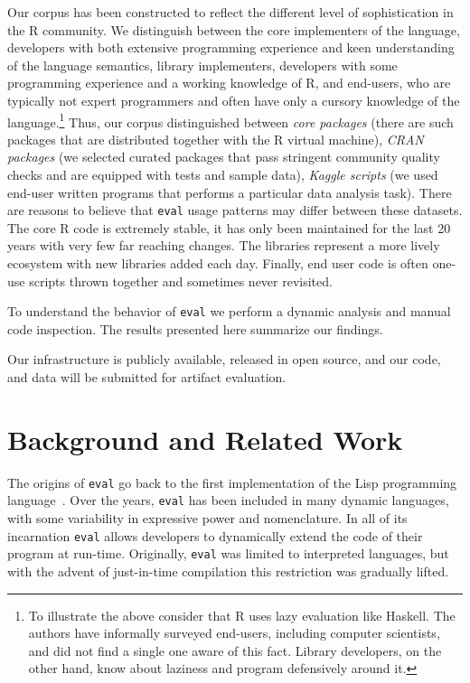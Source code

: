 \documentclass[a4paper,USenglish,cleveref, autoref, thm-restate]{lipics-v2019}
\newcommand{\eval}{\texttt{eval}\xspace}
\begin{document}
Our corpus has been constructed to reflect the different level of
sophistication in the R community. We distinguish between the core
implementers of the language, developers with both extensive programming
experience and keen understanding of the language semantics, library
implementers, developers with some programming experience and a working
knowledge of R, and end-users, who are typically not expert programmers and
often have only a cursory knowledge of the language.\footnote{To illustrate
  the above consider that R uses lazy evaluation like Haskell. The authors
  have informally surveyed end-users, including computer scientists, and did
  not find a single one aware of this fact. Library developers, on the other
  hand, know about laziness and program defensively around it.}  Thus, our
corpus distinguished between \emph{core packages} (there are
\CorpusCorePackages such packages that are distributed together with the R
virtual machine), \emph{CRAN packages} (we selected \CorpusPackages curated
packages that pass stringent community quality checks and are equipped with
tests and sample data), \emph{Kaggle scripts} (we used \CorpusFinishedKaggle
end-user written programs that performs a particular data analysis
task). There are reasons to believe that \eval usage patterns may differ
between these datasets. The core R code is extremely stable, it has only
been maintained for the last 20 years with very few far reaching
changes. The libraries represent a more lively ecosystem with new libraries
added each day.  Finally, end user code is often one-use scripts thrown
together and sometimes never revisited.


To understand the behavior of \eval we perform a dynamic analysis and manual
code inspection. The results presented here summarize our findings.

Our infrastructure is publicly available, released in open source, and our
code, and data will be submitted for artifact evaluation.


\section{Background and Related Work}

The origins of \eval go back to the first implementation of the Lisp
programming language~\cite{lisp}. Over the years, \eval has been included in
many dynamic languages, with some variability in expressive power and
nomenclature. In all of its incarnation \eval allows developers to
dynamically extend the code of their program at run-time.  Originally, \eval
was limited to interpreted languages, but with the advent of just-in-time
compilation this restriction was gradually lifted.
\end{document}

